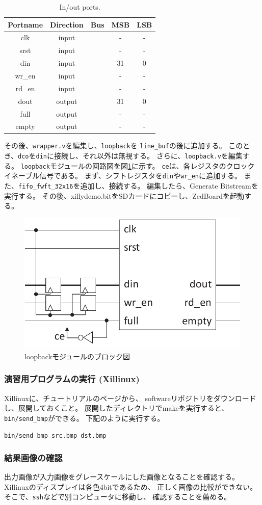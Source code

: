 \documentclass[11pt]{jsarticle}
\begin{document}
\begin{table}[ht]%
	\caption{In/out ports.}
	\label{tbl:inout}
	\begin{center}
		\begin{tabular}{ccccc}
			\hline
			Portname & Direction & Bus & MSB & LSB \\
			\hline \hline
			clk & input &   & - & - \\
			srst & input &   & - & - \\
			din & input & \checkmark & 31 & 0 \\
			wr\_en & input &   & - & - \\
			rd\_en & input &   & - & - \\
			dout & output & \checkmark & 31 & 0 \\
			full & output &   & - & - \\
			empty & output &   & - & - \\
			\hline
		\end{tabular}%
	\end{center}
\end{table}

その後、\verb|wrapper.v|を編集し、\verb|loopback|を
\verb|line_buf|の後に追加する。
このとき、\verb|dco|を\verb|din|に接続し、それ以外は無視する。
さらに、\verb|loopback.v|を編集する。
\verb|loopback|モジュールの回路図を図\ref{img:loopback}に示す。
\verb|ce|は、各レジスタのクロックイネーブル信号である。
まず、シフトレジスタを\verb|din|や\verb|wr_en|に追加する。
また、\verb|fifo_fwft_32x16|を追加し、接続する。
編集したら、Generate Bitstreamを実行する。
その後、xillydemo.bitをSDカードにコピーし、ZedBoardを起動する。

\begin{figure}[ht]
	\centering
	\includegraphics[width=0.5\linewidth]{img/loopback.pdf}
	\caption{loopbackモジュールのブロック図}
	\label{img:loopback}
\end{figure}

\vspace{-0.5cm}

\subsubsection*{演習用プログラムの実行 (Xillinux)}
Xillinuxに、チュートリアルのページから、
softwareリポジトリをダウンロードし、展開しておくこと。
展開したディレクトリでmakeを実行すると、
\verb|bin/send_bmp|ができる。
下記のように実行する。

\begin{center}
	\verb|bin/send_bmp src.bmp dst.bmp|
\end{center}

\subsubsection*{結果画像の確認}
出力画像が入力画像をグレースケールにした画像となることを確認する。
Xillinuxのディスプレイは各色4bitであるため、
正しく画像の比較ができない。
そこで、\verb|ssh|などで別コンピュータに移動し、
確認することを薦める。
\end{document}
